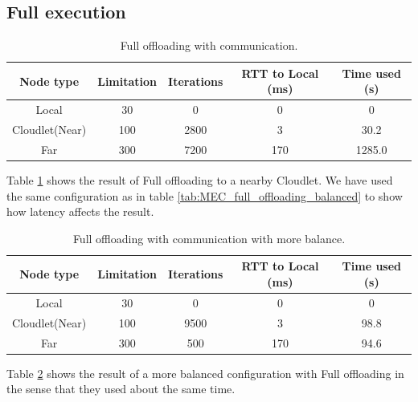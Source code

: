\subsection{Full execution}
\begin{table}[h!]
    \centering
    \begin{tabular}[c]{|c|c|c|c|c|}
        \hline
        Node type & Limitation & Iterations & RTT to Local (ms)& Time used (s)\\
        \hline
        \hline
        Local           & 30 & 0 & 0 & 0  \\
        \hline
        Cloudlet(Near)  & 100 & 2800 & 3 & 30.2 \\
        \hline
        Far             & 300 & 7200 & 170 & 1285.0 \\
        \hline
    \end{tabular}
    \caption{Full offloading with communication.}
    \label{tab:Cloudlet_full_offloading_latency}
\end{table}
Table \ref{tab:Cloudlet_full_offloading_latency} shows the result of Full offloading to a nearby Cloudlet. We have used the same configuration as in table \ref{tab:MEC_full_offloading_balanced} to show how latency affects the result. 

\begin{table}[h!]
    \centering
    \begin{tabular}[c]{|c|c|c|c|c|}
        \hline
        Node type & Limitation & Iterations & RTT to Local (ms)& Time used (s)\\
        \hline
        \hline
        Local           & 30 & 0 & 0 & 0  \\
        \hline
        Cloudlet(Near)  & 100 & 9500 & 3 & 98.8 \\
        \hline
        Far             & 300 & 500 & 170 & 94.6 \\
        \hline
    \end{tabular}
    \caption{Full offloading with communication with more balance.}
    \label{tab:Cloudlet_full_offloading_latency_balanced}
\end{table}
Table \ref{tab:Cloudlet_full_offloading_latency_balanced} shows the result of a more balanced configuration with Full offloading in the sense that they used about the same time.




